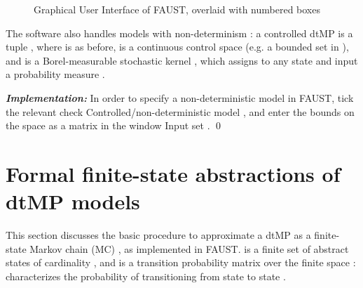 \documentclass{llncs}
\newcommand*\circled[1]{\tikz[baseline=(char.base)]{\node[shape=circle,draw,inner sep=0.5pt] (char) {#1};}}
\newcommand{\software}{\textsf{FAUST}\xspace}
\newcommand{\boxname}[1]{\textsf{#1}}
\begin{document}
\begin{figure}
\begin{center}
 \caption{Graphical User Interface of \software, overlaid with numbered boxes}
\label{fig:GUI_Numbered}
\end{center}
\end{figure}
\vspace{-0.2in}

The software also handles models with non-determinism \cite{tmka2013}:
a controlled dtMP is a tuple , 
where  is as before,
 is a continuous control space (e.g. a bounded set in ), 
and  is a Borel-measurable stochastic kernel
,
which assigns to any state  and input 
a probability measure . 

\textit{\textbf{Implementation: }}
In order to specify a non-deterministic model in \software, 
tick the relevant check \boxname{Controlled/non-deterministic model} \circled{3},  
and enter the bounds on the space  as a  matrix in the window \boxname{Input set} \circled{8}.
\qed

\section{Formal finite-state abstractions of dtMP models}
\label{ABS}

This section discusses the basic procedure to approximate a dtMP  as a finite-state Markov chain (MC) , as implemented in \software.  
 is a finite set of abstract states of cardinality ,  
and  is a transition probability matrix
over the finite space :
 characterizes the probability of transitioning from state  to state .  
\end{document}
